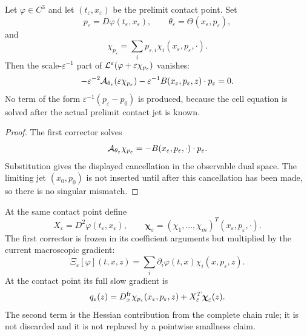 \begin{lemma}
\label{lem:supp_first_order_cancellation}
Let \(\varphi\in C^3\) and let \((t_\varepsilon,x_\varepsilon)\) be the
prelimit contact point.  Set
\[
  p_\varepsilon=D\varphi(t_\varepsilon,x_\varepsilon),\qquad
  \theta_\varepsilon=\Theta(x_\varepsilon,p_\varepsilon),
\]
and
\[
  \chi_{p_\varepsilon}
  =
  \sum_i p_{\varepsilon,i}
  \chi_i(x_\varepsilon,p_\varepsilon,\cdot).
\]
Then the scale-\(\varepsilon^{-1}\) part of
\(\mathcal L^\varepsilon(\varphi+\varepsilon\chi_{p_\varepsilon})\) vanishes:
\[
  -\varepsilon^{-2}\mathcal A_{\theta_\varepsilon}
  (\varepsilon\chi_{p_\varepsilon})
  -\varepsilon^{-1}B(x_\varepsilon,p_\varepsilon,z)\cdot p_\varepsilon
  =0.
\]
No term of the form
\(\varepsilon^{-1}(p_\varepsilon-p_0)\) is produced, because the cell equation
is solved after the actual prelimit contact jet is known.
\end{lemma}

\begin{proof}
The first corrector solves
\[
  \mathcal A_{\theta_\varepsilon}\chi_{p_\varepsilon}
  =
  -B(x_\varepsilon,p_\varepsilon,\cdot)\cdot p_\varepsilon .
\]
Substitution gives the displayed cancellation in the observable dual space.
The limiting jet \((x_0,p_0)\) is not inserted until after this cancellation
has been made, so there is no singular mismatch.
\end{proof}

\begin{definition}
\label{def:supp_contact_frozen_test}
At the same contact point define
\[
  X_\varepsilon=D^2\varphi(t_\varepsilon,x_\varepsilon),\qquad
  \boldsymbol\chi_\varepsilon
  =
  (\chi_1,\ldots,\chi_m)^T(x_\varepsilon,p_\varepsilon,\cdot).
\]
The first corrector is frozen in its coefficient arguments but multiplied by
the current macroscopic gradient:
\[
  \Xi_\varepsilon[\varphi](t,x,z)
  =
  \sum_i \partial_i\varphi(t,x)
  \chi_i(x,p_\varepsilon,z).
\]
At the contact point its full slow gradient is
\[
  q_\varepsilon(z)
  =
  D_x^{\rm fr}\chi_{p_\varepsilon}(x_\varepsilon,p_\varepsilon,z)
  +X_\varepsilon^T\boldsymbol\chi_\varepsilon(z).
\]
The second term is the Hessian contribution from the complete chain rule; it
is not discarded and it is not replaced by a pointwise smallness claim.
\end{definition}

